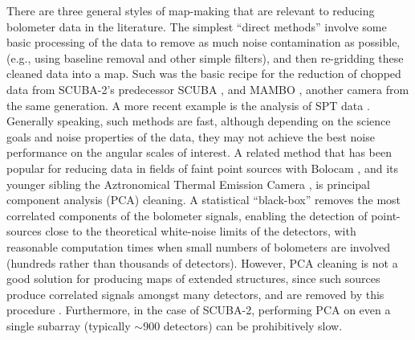 \documentclass[useAMS,usenatbib,nofootinbib]{mn2e}
\newcommand{\scuba}{SCUBA-2}
\begin{document}
There are three general styles of map-making that are relevant to
reducing bolometer data in the literature. The simplest ``direct
methods'' involve some basic processing of the data to remove as much
noise contamination as possible, (e.g., using baseline removal and
other simple filters), and then re-gridding these cleaned data into a
map. Such was the basic recipe for the reduction of chopped data from
SCUBA-2's predecessor SCUBA
\citep{1998ASPC..145..216J,2000ASPC..216..559J}, and MAMBO
\citep[e.g.,][]{omont2001}, another camera from the same generation. A
more recent example is the analysis of SPT data
\citep{schaffer2011}. Generally speaking, such methods are fast,
although depending on the science goals and noise properties of the
data, they may not achieve the best noise performance on the angular
scales of interest. A related method that has been popular for
reducing data in fields of faint point sources with Bolocam
\citep[e.g.,][]{laurent2005}, and its younger sibling the Aztronomical
Thermal Emission Camera \citep[AzTEC, e.g.,][]{scott2008}, is
principal component analysis (PCA) cleaning. A statistical
``black-box'' removes the most correlated components of the bolometer
signals, enabling the detection of point-sources close to the
theoretical white-noise limits of the detectors, with reasonable
computation times when small numbers of bolometers are involved
(hundreds rather than thousands of detectors). However, PCA cleaning
is not a good solution for producing maps of extended structures,
since such sources produce correlated signals amongst many detectors,
and are removed by this procedure \citep[an exception is the iterative
PCA approach of][]{aguirre2011}. Furthermore, in the case of \scuba,
performing PCA on even a single subarray (typically $\sim$900
detectors) can be prohibitively slow.
\end{document}
